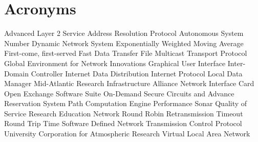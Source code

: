 

\section*{Acronyms}
\begin{acronym}
	{Advanced Layer 2 Service}
	{Address Resolution Protocol}
	{Autonomous System Number}
	{Dynamic Network System}
	{Exponentially Weighted Moving Average}
	{First-come, first-served}
	{Fast Data Transfer}
	{File Multicast Transport Protocol}
	{Global Environment for Network Innovations}
	{Graphical User Interface}
	{Inter-Domain Controller}
	{Internet Data Distribution}
	{Internet Protocol}
	{Local Data Manager}
	{Mid-Atlantic Research Infrastructure Alliance}
	{Network Interface Card}
	{Open Exchange Software Suite}
	{On-Demand Secure Circuits and Advance Reservation System}
	{Path Computation Engine}
	{Performance Sonar}
	{Quality of Service}
	{Research Education Network}
	{Round Robin}
	{Retransmission Timeout}
	{Round Trip Time}
	{Software  Defined Network}
	{Transmission Control Protocol}
	{University Corporation for Atmospheric Research}
	{Virtual Local Area Network}

\end{acronym}